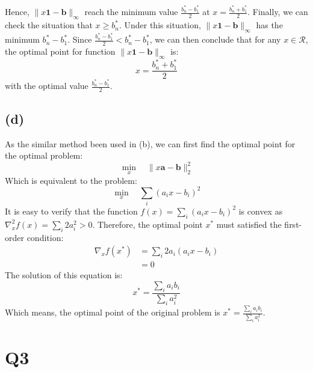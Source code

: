 \documentclass[10pt,a4paper]{article}
\begin{document}
Hence, $\| x \mathbf{1} - \mathbf{b} \|_{\infty}$ reach the minimum value $\frac{b^{*}_{n} - b^{*}_{1}}{2}$ at $x = \frac{b^{*}_{n} + b^{*}_{1}}{2}$. Finally, we can check the situation that $x \geq b^{*}_{n}$. Under this situation, $\| x \mathbf{1} - \mathbf{b} \|_{\infty}$ has the minimum $b^{*}_{n} - b^{*}_{1}$. Since $\frac{b^{*}_{n} - b^{*}_{1}}{2} < b^{*}_{n} - b^{*}_{1}$, we can then conclude that for any $x \in \mathcal{R}$, the optimal point for function $\| x \mathbf{1} - \mathbf{b} \|_{\infty}$ is: 
\begin{equation*}
	x = \frac{b^{*}_{n} + b^{*}_{1}}{2}
\end{equation*}
with the optimal value $\frac{b^{*}_{n} - b^{*}_{1}}{2}$.

\subsection*{(d)}
As the similar method been used in (b), we can first find the optimal point for the optimal problem:
\begin{equation*}
	\displaystyle\min_{x} \quad \| x \mathbf{a} - \mathbf{b} \|^{2}_{2}
\end{equation*}
Which is equivalent to the problem:
\begin{equation*}
	\displaystyle\min_{x} \quad \displaystyle\sum_{i} (a_{i}x - b_{i})^{2}
\end{equation*}
It is easy to verify that the function $f(x) = \displaystyle\sum_{i} (a_{i}x - b_{i})^{2}$ is convex as $\nabla_{x}^{2} f(x) = \displaystyle\sum_{i}2 a_{i}^{2} > 0$. Therefore, the optimal point $x^{*}$ must satisfied the first-order condition:
\begin{equation*}
	\begin{aligned}
		\nabla_{x} f(x^{*}) &= \displaystyle\sum_{i} 2a_{i}(a_{i}x - b_{i}) \\
		&= 0
	\end{aligned}
\end{equation*}
The solution of this equation is:
\begin{equation*}
	x^{*} = \frac{\displaystyle\sum_{i}a_{i} b_{i}}{\displaystyle\sum_{i} a_{i}^{2}}
\end{equation*}
Which means, the optimal point of the original problem is $x^{*} = \frac{\displaystyle\sum_{i}a_{i} b_{i}}{\displaystyle\sum_{i} a_{i}^{2}}$.

\section*{Q3}
\end{document}

